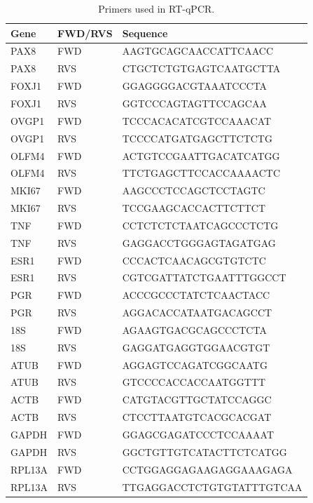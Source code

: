 \begin{refsection}
    \begin{table}[htbp]
        \centering
        \footnotesize
        \renewcommand{\arraystretch}{1.2}
        \caption{Primers used in RT-qPCR.}
        \label{chapter4_table_S2}
        \begin{tabularx}{\textwidth}{l l X} %
            \toprule
            \textbf{Gene} & \textbf{FWD/RVS} & \textbf{Sequence} \\
            \midrule
            PAX8   & FWD & AAGTGCAGCAACCATTCAACC \\
            PAX8   & RVS & CTGCTCTGTGAGTCAATGCTTA \\
            FOXJ1  & FWD & GGAGGGGACGTAAATCCCTA \\
            FOXJ1  & RVS & GGTCCCAGTAGTTCCAGCAA \\
            OVGP1  & FWD & TCCCACACATCGTCCAAACAT \\
            OVGP1  & RVS & TCCCCATGATGAGCTTCTCTG \\
            OLFM4  & FWD & ACTGTCCGAATTGACATCATGG \\
            OLFM4  & RVS & TTCTGAGCTTCCACCAAAACTC \\
            MKI67  & FWD & AAGCCCTCCAGCTCCTAGTC \\
            MKI67  & RVS & TCCGAAGCACCACTTCTTCT \\
            TNF    & FWD & CCTCTCTCTAATCAGCCCTCTG \\
            TNF    & RVS & GAGGACCTGGGAGTAGATGAG \\
            ESR1   & FWD & CCCACTCAACAGCGTGTCTC \\
            ESR1   & RVS & CGTCGATTATCTGAATTTGGCCT \\
            PGR    & FWD & ACCCGCCCTATCTCAACTACC \\
            PGR    & RVS & AGGACACCATAATGACAGCCT \\
            18S    & FWD & AGAAGTGACGCAGCCCTCTA \\
            18S    & RVS & GAGGATGAGGTGGAACGTGT \\
            ATUB   & FWD & AGGAGTCCAGATCGGCAATG \\
            ATUB   & RVS & GTCCCCACCACCAATGGTTT \\
            ACTB   & FWD & CATGTACGTTGCTATCCAGGC \\
            ACTB   & RVS & CTCCTTAATGTCACGCACGAT \\
            GAPDH  & FWD & GGAGCGAGATCCCTCCAAAAT \\
            GAPDH  & RVS & GGCTGTTGTCATACTTCTCATGG \\
            RPL13A & FWD & CCTGGAGGAGAAGAGGAAAGAGA \\
            RPL13A & RVS & TTGAGGACCTCTGTGTATTTGTCAA \\
            \bottomrule
        \end{tabularx}
    \end{table}


\end{refsection}
